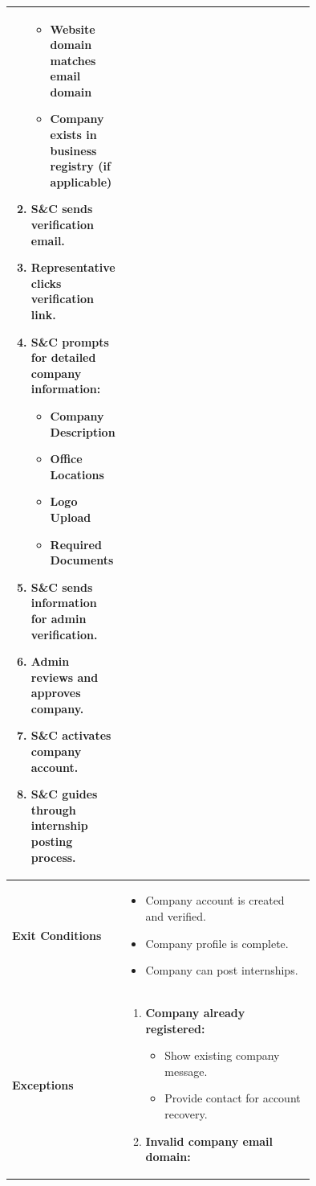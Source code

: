 \begin{center}
\begin{longtable}{|l|p{0.75\linewidth}|}
\begin{enumerate}
\begin{itemize}
                \item Website domain matches email domain
                \item Company exists in business registry (if applicable)
            \end{itemize}
            \item S\&C sends verification email.
            \item Representative clicks verification link.
            \item S\&C prompts for detailed company information:
            \begin{itemize}
                \item Company Description
                \item Office Locations
                \item Logo Upload
                \item Required Documents
            \end{itemize}
            \item S\&C sends information for admin verification.
            \item Admin reviews and approves company.
            \item S\&C activates company account.
            \item S\&C guides through internship posting process.
        \end{enumerate} \\
        \hline
        \textbf{Exit Conditions}   & 
        \begin{itemize}
            \item Company account is created and verified.
            \item Company profile is complete.
            \item Company can post internships.
        \end{itemize} \\
        \hline
        \textbf{Exceptions}       & 
        \begin{enumerate}
            \item \textbf{Company already registered:}
            \begin{itemize}
                \item Show existing company message.
                \item Provide contact for account recovery.
            \end{itemize} 
            \item \textbf{Invalid company email domain:} \begin{itemize}

\end{itemize}
\end{enumerate}
\end{longtable}
\end{center}
